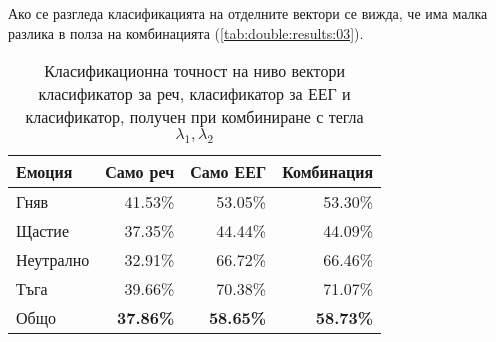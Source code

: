 \documentclass[main.tex]{subfiles}
\begin{document}
Ако се разгледа класификацията на отделните вектори се вижда, че има малка разлика в полза на комбинацията (\autoref{tab:double:results:03}).

\begin{table}[h]
	\begin{center}
		\begin{tabular}{|l|r r r|}
			\hline
			Емоция    & Само реч         & Само ЕЕГ         & Комбинация     \\
			\hline
			Гняв      & 41.53\%          & 53.05\%          & 53.30\%          \\
			Щастие    & 37.35\%          & 44.44\%          & 44.09\%          \\
			Неутрално & 32.91\%           & 66.72\%          & 66.46\%          \\
			Тъга      & 39.66\%          & 70.38\%          & 71.07\%          \\
			\hline
			\hline
			Общо      & \textbf{37.86\%} & \textbf{58.65\%} & \textbf{58.73\%} \\
			\hline
		\end{tabular}
		\caption{Класификационна точност на ниво вектори класификатор за реч, класификатор за ЕЕГ и класификатор, получен при комбиниране с тегла $\lambda_1, \lambda_2$}
		\label{tab:double:results:03}
	\end{center}
\end{table}
\end{document}
